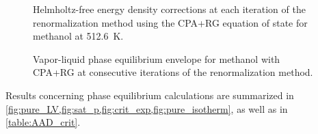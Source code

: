 \documentclass[preprint,12pt,3p]{elsarticle}
\begin{document}
\begin{figure}[!ht]
\centering
\captionsetup{justification=centering}
\caption{Helmholtz-free energy density corrections at each iteration of the renormalization method using the CPA+RG equation of state for methanol at 512.6~K.}
\label{fig:dfn}
\end{figure}

\begin{figure}[!ht]
\centering
\captionsetup{justification=centering}
\caption{Vapor-liquid phase equilibrium envelope for methanol with CPA+RG at consecutive iterations of the renormalization method.}
\label{fig:PV_evol}
\end{figure}

Results concerning phase equilibrium calculations are summarized in \cref{fig:pure_LV,fig:sat_p,fig:crit_exp,fig:pure_isotherm}, as well as in \cref{table:AAD_crit}.
\end{document}
